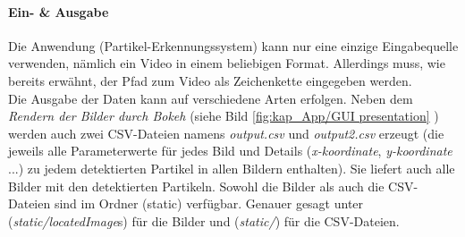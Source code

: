 \paragraph{Ein- \& Ausgabe \\}
Die Anwendung (Partikel-Erkennungssystem) kann nur eine einzige Eingabequelle verwenden, nämlich ein Video in einem beliebigen Format. Allerdings muss, wie bereits erwähnt, der Pfad zum Video als Zeichenkette eingegeben werden.\\

Die Ausgabe der Daten kann auf verschiedene Arten erfolgen. Neben dem \textit{Rendern der Bilder durch Bokeh} (siehe Bild \ref{fig:kap_App/GUI presentation} ) werden auch zwei CSV-Dateien namens \textit{output.csv} und \textit{output2.csv} erzeugt (die jeweils alle Parameterwerte für jedes Bild und Details (\textit{x-koordinate}, \textit{y-koordinate} ...) zu jedem detektierten Partikel in allen Bildern enthalten).
Sie liefert auch alle Bilder mit den detektierten Partikeln. Sowohl die Bilder als auch die CSV-Dateien sind im Ordner (static) verfügbar. Genauer gesagt unter (\textit{static/locatedImage}s) für die Bilder und (\textit{static/}) für die CSV-Dateien.



